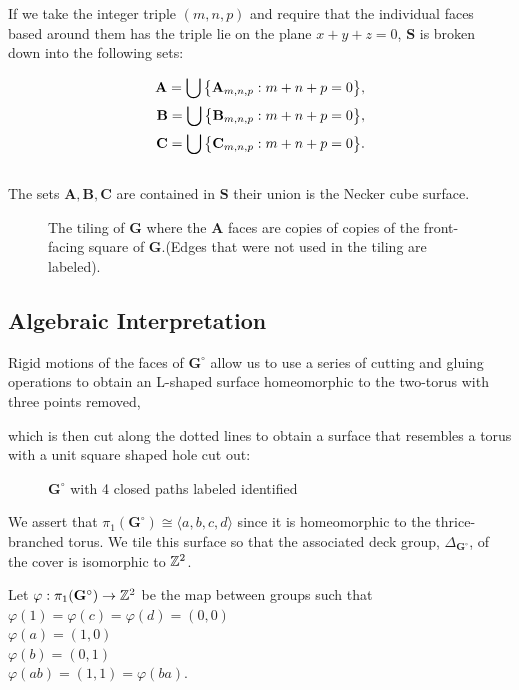 \documentclass[]{article}
\def\bG{\mathbf{G}} \def\bGs{\mathbf{G}^\circ}
\def\<{\langle} \def\>{\rangle}
\begin{document}
\noindent If we take the integer triple $(m,n,p)$ and require that the individual faces based around them  has the triple lie on the plane $x+y+z=0$, $\mathbf{S}$ is broken down into the following sets:

\begin{align*}
\mathbf{A}=\bigcup\big{\{}\mathbf{A}_{m,n,p}: m+n+p=0\big{\}},
\\\mathbf{B}=\bigcup\big{\{}\mathbf{B}_{m,n,p}: m+n+p=0\big{\}},
\\\mathbf{C}=\bigcup\big{\{}\mathbf{C}_{m,n,p}: m+n+p=0\big{\}}.
\end{align*}\\
The sets $\mathbf{A},\mathbf{B},\mathbf{C}$ are contained in $\mathbf{S}$ their union is the Necker cube surface. 

\begin{figure}[H]
\centering

\caption{The tiling of $\bG$ where the $\mathbf{A}$ faces are copies of copies of the front-facing square of $\bG$.(Edges that were not used in the tiling are labeled).}
\end{figure}

\subsection{Algebraic Interpretation}
Rigid motions of the faces of $\bGs$ allow us to use a series of cutting and gluing operations to obtain an L-shaped surface homeomorphic to the two-torus with three points removed,\\
\begin{figure}[H]
\centering

\end{figure}
which is then cut along the dotted lines to obtain a surface that resembles a torus with a unit square shaped hole cut out:\\
\begin{figure}[H]
\centering

\caption{$\bGs$ with 4 closed paths labeled identified}
\end{figure}
We assert that $\pi_1(\bGs)\cong \<a,b,c,d\>$ since it is homeomorphic to the thrice-branched torus. We tile this surface so that the associated deck group, $\Delta_{\bGs}$, of the cover is isomorphic to $\mathbb{Z}^2$. 
\begin{Def}
Let $\varphi:\pi_1(\bGs)\rightarrow \ZZ^2$ be the map between groups such that \\$\varphi(1)=\varphi(c)=\varphi(d)=(0,0)$\\ $\varphi(a)=(1,0)$\\$\varphi(b)=(0,1)$\\ $\varphi(ab)=(1,1)=\varphi(ba)$.
\end{Def}
\end{document}

